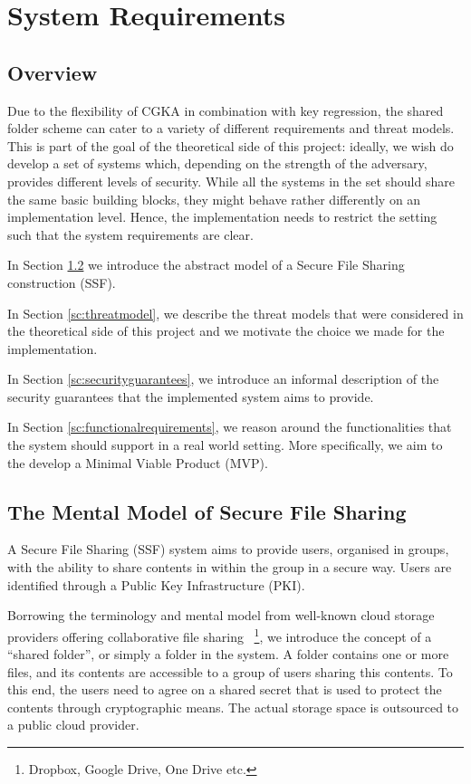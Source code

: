 \chapter{System Requirements}\label{ch:system-requirements}

\section{Overview}

Due to the flexibility of CGKA in combination with key regression, 
the shared folder scheme can cater to a variety of different requirements and threat models.
This is part of the goal of the theoretical side of this
project: ideally, we wish do develop a set of systems which, depending on the strength of the adversary,
provides different levels of security. While all the systems in the set should share the same basic building
blocks, they might behave rather differently on an implementation level. Hence, the implementation
needs to restrict the setting such that the system requirements are clear.

In Section \cref{sc:mentalmodel} we introduce the abstract model of a Secure File Sharing construction (SSF).

In Section \cref{sc:threatmodel}, we describe the threat models that were considered in the theoretical side of this project
and we motivate the choice we made for the implementation. 

In Section \cref{sc:securityguarantees}, we introduce an informal description of the security guarantees 
that the implemented system aims to provide.

In Section \cref{sc:functionalrequirements}, we reason around the functionalities that the system should support in a real world setting.
More specifically, we aim to the develop a Minimal Viable Product (MVP).

\section{The Mental Model of Secure File Sharing} \label{sc:mentalmodel}

A Secure File Sharing (SSF) system aims to provide users, organised in groups, 
with the ability to share contents in within the group in a secure way.
Users are identified through a Public Key Infrastructure (PKI).

Borrowing the terminology and mental model from well-known cloud storage providers offering collaborative file sharing
~\footnote{Dropbox, Google Drive, One Drive etc.},
we introduce the concept of a ``shared folder'', or simply a folder in the system.
A folder contains one or more files, and its contents are accessible to a group of users sharing this contents.
To this end, the users need to agree on a shared secret that is used to protect the contents through cryptographic means.
The actual storage space is outsourced to a public cloud provider.

